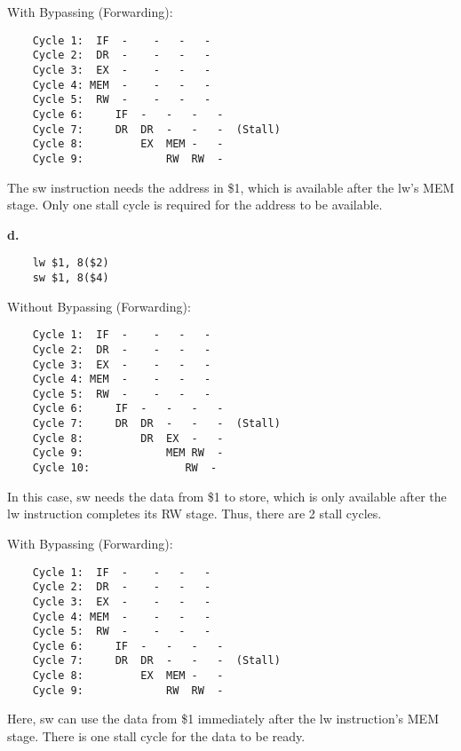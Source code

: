 \documentclass{article}
\begin{document}
With Bypassing (Forwarding):

\begin{verbatim}
    Cycle 1:  IF  -    -   -   -  
    Cycle 2:  DR  -    -   -   -  
    Cycle 3:  EX  -    -   -   -  
    Cycle 4: MEM  -    -   -   -  
    Cycle 5:  RW  -    -   -   -  
    Cycle 6:     IF  -   -   -   -  
    Cycle 7:     DR  DR  -   -   -  (Stall)
    Cycle 8:         EX  MEM -   -  
    Cycle 9:             RW  RW  -  
\end{verbatim}

The sw instruction needs the address in \$1,
which is available after the lw's MEM stage.
Only one stall cycle is required for the
address to be available.

\textbf{d.}

\begin{verbatim}
    lw $1, 8($2)
    sw $1, 8($4)
\end{verbatim}

Without Bypassing (Forwarding):

\begin{verbatim}
    Cycle 1:  IF  -    -   -   -  
    Cycle 2:  DR  -    -   -   -  
    Cycle 3:  EX  -    -   -   -  
    Cycle 4: MEM  -    -   -   -  
    Cycle 5:  RW  -    -   -   -  
    Cycle 6:     IF  -   -   -   -  
    Cycle 7:     DR  DR  -   -   -  (Stall)
    Cycle 8:         DR  EX  -   -  
    Cycle 9:             MEM RW  -  
    Cycle 10:               RW  -  
\end{verbatim}

In this case, sw needs the data from \$1 to
store, which is only available after the lw
instruction completes its RW stage. Thus,
there are 2 stall cycles.

With Bypassing (Forwarding):

\begin{verbatim}
    Cycle 1:  IF  -    -   -   -  
    Cycle 2:  DR  -    -   -   -  
    Cycle 3:  EX  -    -   -   -  
    Cycle 4: MEM  -    -   -   -  
    Cycle 5:  RW  -    -   -   -  
    Cycle 6:     IF  -   -   -   -  
    Cycle 7:     DR  DR  -   -   -  (Stall)
    Cycle 8:         EX  MEM -   -  
    Cycle 9:             RW  RW  -  
\end{verbatim}

Here, sw can use the data from \$1
immediately after the lw instruction's
MEM stage. There is one stall cycle for
the data to be ready.

\newpage
\end{document}
